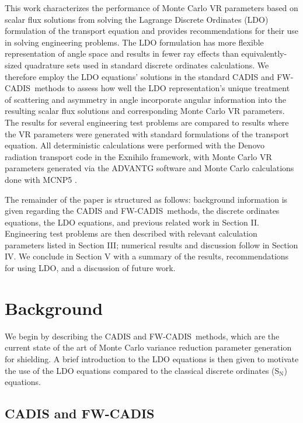 \documentclass{article} %
\newcommand{\sn}{S$_\mathrm{N}$}
\newcommand{\fwc}{\mbox{FW-CADIS}}
\begin{document}
This work characterizes the performance of Monte Carlo VR parameters based on
scalar flux solutions from solving the Lagrange Discrete Ordinates (LDO)
formulation of the transport equation \cite{ahrens} and provides recommendations for their use in solving engineering problems. The LDO formulation has
more flexible representation of angle space and results in fewer ray effects
than equivalently-sized quadrature sets used in standard discrete ordinates
calculations. We therefore employ the LDO equations' solutions in the standard
CADIS and \fwc\ methods to assess how well the LDO representation's unique
treatment of scattering and asymmetry in angle incorporate angular information
into the resulting scalar flux solutions and corresponding Monte Carlo VR
parameters. The results for several engineering test problems are compared to
results where the VR parameters were generated with standard formulations of
the transport equation. All deterministic calculations were performed with the
Denovo radiation transport code \cite{denovo} in the Exnihilo framework, with
Monte Carlo VR parameters generated via the ADVANTG software \cite{advantg}
and Monte Carlo calculations done with MCNP5 \cite{mcnp}.

The remainder of the paper is structured as follows: background information is
given regarding the CADIS and \fwc\ methods, the discrete ordinates equations,
the LDO equations, and previous related work in Section II. Engineering test
problems are then described with relevant calculation parameters listed in
Section III; numerical results and discussion follow in Section IV. We
conclude in Section V with a summary of the results, recommendations for using LDO, and a discussion of
future work.

\section{Background}
\label{sec:background}

We begin by describing the CADIS and \fwc\ methods, which are the current
state of the art of Monte Carlo variance reduction parameter generation for
shielding. A brief introduction to the LDO equations is then given to
motivate the use of the LDO equations compared to the classical
discrete ordinates (\sn) equations.

\subsection{CADIS and \fwc}
\end{document}
